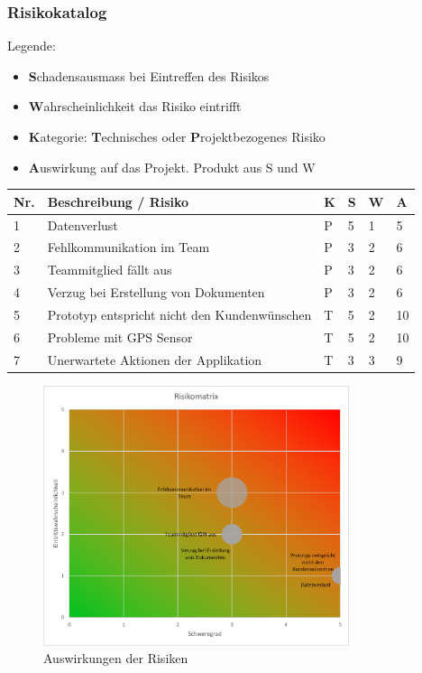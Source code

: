\documentclass[a4paper]{scrreprt}
\begin{document}
\subsubsection{Risikokatalog}
\label{sssec:Risikokatalog}
Legende:
\begin{itemize}
	\item \textbf{S}chadensausmass bei Eintreffen des Risikos
	\item \textbf{W}ahrscheinlichkeit das Risiko eintrifft
	\item \textbf{K}ategorie: \textbf{T}echnisches oder \textbf{P}rojektbezogenes Risiko
	\item \textbf{A}uswirkung auf das Projekt. Produkt aus S und W
\end{itemize}

\vspace{1em}
\noindent
\begin{tabular}{|p{}|p{}|p{}|p{}|p{}||p{}|}
	\hline
	\textbf{Nr.} & \textbf{Beschreibung / Risiko} & \textbf{K} & \textbf{S} & \textbf{W} & \textbf{A} \\
	\hline
	1 & Datenverlust & P & 5 & 1 & 5\\
	\hline
	2 & Fehlkommunikation im Team & P & 3 & 2 & 6 \\
	\hline
	3 & Teammitglied fällt aus & P & 3 & 2 & 6 \\
	\hline
	4 & Verzug bei Erstellung von Dokumenten & P & 3 & 2 & 6 \\
	\hline
	5 & Prototyp entspricht nicht den Kundenwünschen & T & 5 & 2 & 10 \\
	\hline
	6 & Probleme mit GPS Sensor & T & 5 & 2 & 10 \\
	\hline
	7 & Unerwartete Aktionen der Applikation & T & 3 & 3 & 9\\
	\hline
\end{tabular}

\vspace{1em}

\begin{figure}[h!]
	\centering
	\includegraphics[keepaspectratio, width=0.8\textwidth]{RisikoMatrix}
	\caption{Auswirkungen der Risiken}
\end{figure}
\end{document}
